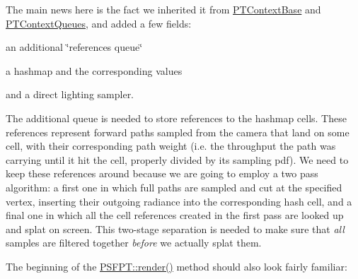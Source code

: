 \begin{DoxyParagraph}{}
The main news here is the fact we inherited it from \hyperlink{struct_p_t_context_base}{P\+T\+Context\+Base} and \hyperlink{struct_p_t_context_queues}{P\+T\+Context\+Queues}, and added a few fields\+: ~\newline

\begin{DoxyItemize}
\item an additional \char`\"{}references queue\char`\"{}
\item a hashmap and the corresponding values
\item and a direct lighting sampler. 
\end{DoxyItemize}
\end{DoxyParagraph}
\begin{DoxyParagraph}{}
The additional queue is needed to store references to the hashmap cells. These references represent forward paths sampled from the camera that land on some cell, with their corresponding path weight (i.\+e. the throughput the path was carrying until it hit the cell, properly divided by its sampling pdf). We need to keep these references around because we are going to employ a two pass algorithm\+: a first one in which full paths are sampled and cut at the specified vertex, inserting their outgoing radiance into the corresponding hash cell, and a final one in which all the cell references created in the first pass are looked up and splat on screen. This two-\/stage separation is needed to make sure that {\itshape all} samples are filtered together {\itshape before} we actually splat them.
\end{DoxyParagraph}
\begin{DoxyParagraph}{}
The beginning of the \hyperlink{struct_p_s_f_p_t_aac923cb36f8f1d8ad27f01becef44fd9}{P\+S\+F\+P\+T\+::render()} method should also look fairly familiar\+:
\end{DoxyParagraph}

